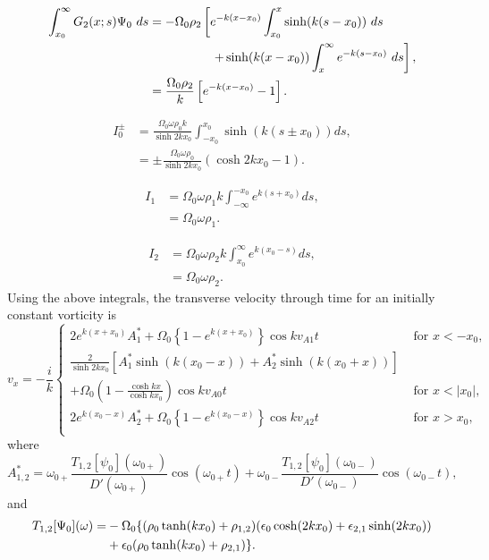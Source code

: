 \documentclass[12pt]{../style-files/ociamthesis}
\begin{document}
\begin{align}
\int_{x_0}^{\infty} G_2(x;s) \Psi_0 ~ds &= - \Omega_0 \rho_2 \left[ e^{-k(x-x_0)} \int_{x_0}^{x} \sinh(k(s-x_0)) ~ds \right. \notag \\
&\qquad \qquad \quad \left. + \sinh(k(x-x_0)) \int_{x}^{\infty} e^{-k(s-x_0)} ~ds \right], \notag \\
&= \frac{\Omega_0 \rho_2}{k} \left[ e^{-k(x-x_0)} - 1 \right].
\end{align}

\begin{align}
I_0^\pm &= \frac{\Omega_0\omega\rho_0k}{\sinh{2kx_0}} \int_{-x_0}^{x_0} \sinh(k(s \pm x_0)) ds, \\
&= \pm \frac{\Omega_0 \omega \rho_0}{\sinh{2kx_0}} (\cosh{2kx_0 - 1}).
\end{align}

\begin{align}
I_1 &= \Omega_0\omega\rho_1k \int_{-\infty}^{-x_0} e^{k(s + x_0)} ds, \\
&= \Omega_0 \omega \rho_1.
\end{align}

\begin{align}
I_2 &= \Omega_0\omega\rho_2k \int_{x_0}^{\infty} e^{k(x_0 - s)} ds, \\
&= \Omega_0 \omega \rho_2.
\end{align}
Using the above integrals, the transverse velocity through time for an initially constant vorticity is
\begin{equation}
v_x = -\frac{i}{k}\begin{cases}
2 e^{k(x+x_0)} A^*_1 + \Omega_0 \left\{1 - e^{k(x+x_0)}\right\} \cos{kv_{A1}t} \quad &\text{ for } x<-x_0, \\
\frac{2}{\sinh{2kx_0}} \left[ A^*_1 \sinh(k(x_0 - x)) + A^*_2 \sinh(k(x_0 + x)) \right] & \\
+ \Omega_0 \left( 1 - \frac{\cosh{kx}}{\cosh{kx_0}} \right)\cos{kv_{A0}t} \quad &\text{ for } x < |x_0|, \\
2 e^{k(x_0-x)} A^*_2 + \Omega_0 \left\{1 - e^{k(x_0-x)}\right\} \cos{kv_{A2}t} \quad &\text{ for } x>x_0, \\
\end{cases}
\label{sol slab}
\end{equation}
where
\begin{equation}
A^*_{1,2} = \omega_{0+} \frac{T_{1,2}[\psi_0](\omega_{0+})}{D'(\omega_{0+})} \cos(\omega_{0+} t) + \omega_{0-}\frac{T_{1,2}[\psi_0](\omega_{0-})}{D'(\omega_{0-})} \cos(\omega_{0-} t),
\end{equation}
and
\begin{align}
T_{1,2}[\Psi_0](\omega) = &-\Omega_0\{ (\rho_0 \tanh(kx_0) + \rho_{1,2}) (\epsilon_0 \cosh(2kx_0) + \epsilon_{2,1}\sinh(2kx_0)) \notag \\
&+ \epsilon_0(\rho_0 \tanh(kx_0) + \rho_{2,1}) \}.
\end{align}
\end{document}
